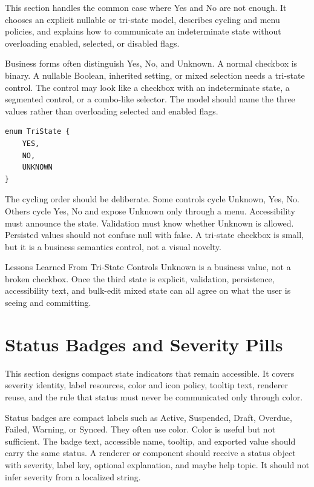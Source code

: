 \begin{roadmapbox}
This section handles the common case where Yes and No are not enough. It chooses
an explicit nullable or tri-state model, describes cycling and menu policies,
and explains how to communicate an indeterminate state without overloading
enabled, selected, or disabled flags.
\end{roadmapbox}

Business forms often distinguish Yes, No, and Unknown. A normal checkbox is binary. A
nullable Boolean, inherited setting, or mixed selection needs a tri-state control. The
control may look like a checkbox with an indeterminate state, a segmented control, or a
combo-like selector. The model should name the three values rather than overloading
selected and enabled flags.

\begin{lstlisting}[caption={Tri-state values should be explicit.}]
enum TriState {
    YES,
    NO,
    UNKNOWN
}
\end{lstlisting}

The cycling order should be deliberate. Some controls cycle Unknown, Yes, No. Others
cycle Yes, No and expose Unknown only through a menu. Accessibility must announce the
state. Validation must know whether Unknown is allowed. Persisted values should not
confuse null with false. A tri-state checkbox is small, but it is a business semantics
control, not a visual novelty.

\begin{principlebox}{Lessons Learned From Tri-State Controls}
Unknown is a business value, not a broken checkbox. Once the third state is
explicit, validation, persistence, accessibility text, and bulk-edit mixed state
can all agree on what the user is seeing and committing.
\end{principlebox}

\section{Status Badges and Severity Pills}

\begin{roadmapbox}
This section designs compact state indicators that remain accessible. It covers
severity identity, label resources, color and icon policy, tooltip text,
renderer reuse, and the rule that status must never be communicated only through
color.
\end{roadmapbox}

Status badges are compact labels such as Active, Suspended, Draft, Overdue, Failed,
Warning, or Synced. They often use color. Color is useful but not sufficient. The badge
text, accessible name, tooltip, and exported value should carry the same status. A
renderer or component should receive a status object with severity, label key, optional
explanation, and maybe help topic. It should not infer severity from a localized string.

